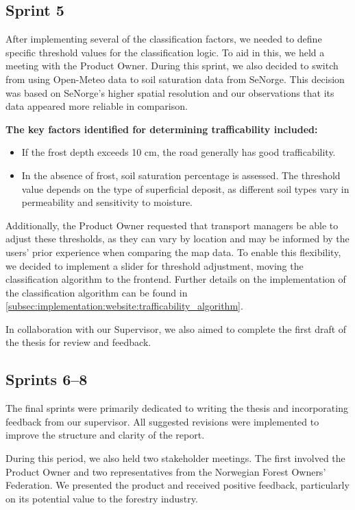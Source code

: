 \subsection*{Sprint 5}

After implementing several of the classification factors, we needed to define specific threshold values for the classification logic. To aid in this, we held a meeting with the Product Owner. During this sprint, we also decided to switch from using Open-Meteo data to soil saturation data from SeNorge. This decision was based on SeNorge’s higher spatial resolution and our observations that its data appeared more reliable in comparison.

\textbf{The key factors identified for determining trafficability included:}

\begin{itemize}
    \item If the frost depth exceeds 10 cm, the road generally has good trafficability.
    \item In the absence of frost, soil saturation percentage is assessed. The threshold value depends on the type of superficial deposit, as different soil types vary in permeability and sensitivity to moisture.
\end{itemize}

Additionally, the Product Owner requested that transport managers be able to adjust these thresholds, as they can vary by location and may be informed by the users’ prior experience when comparing the map data. To enable this flexibility, we decided to implement a slider for threshold adjustment, moving the classification algorithm to the frontend. Further details on the implementation of the classification algorithm can be found in \autoref{subsec:implementation:website:trafficability_algorithm}.

In collaboration with our Supervisor, we also aimed to complete the first draft of the thesis for review and feedback.

\subsection*{Sprints 6–8}

The final sprints were primarily dedicated to writing the thesis and incorporating feedback from our supervisor. All suggested revisions were implemented to improve the structure and clarity of the report.

During this period, we also held two stakeholder meetings. The first involved the Product Owner and two representatives from the Norwegian Forest Owners' Federation. We presented the product and received positive feedback, particularly on its potential value to the forestry industry.

